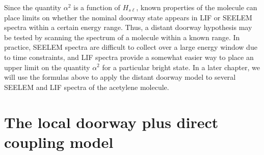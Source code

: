 \documentclass[12pt]{mitthesis}
\begin{document}
Since the quantity $\alpha^2$ is a function of $H_{s\ell}$, known
properties of the molecule can place limits on whether the nominal
doorway state appears in LIF or SEELEM spectra within a certain energy
range.  Thus, a distant doorway hypothesis may be tested by scanning
the spectrum of a molecule within a known range.  In practice, SEELEM
spectra are difficult to collect over a large energy window due to
time constraints, and LIF spectra provide a somewhat easier way to
place an upper limit on the quantity $\alpha^2$ for a particular
bright state.  In a later chapter, we will use the formulas above to
apply the distant doorway model to several SEELEM and LIF spectra of
the acetylene molecule.

\section{The local doorway plus direct coupling model}
\label{sec:model-local-plus-direct}
\end{document}
